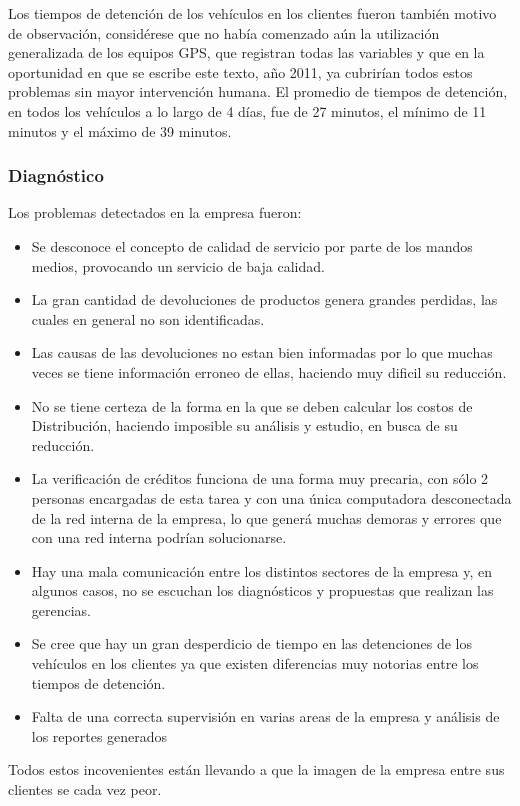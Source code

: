 \documentclass[a4paper,10pt]{article}
\begin{document}
	Los tiempos de detención de los vehículos en los clientes fueron también motivo de observación, considérese que no había comenzado aún la utilización generalizada de los equipos GPS, que registran todas las variables y que en la oportunidad en que se escribe este texto, año 2011, ya cubrirían todos estos problemas sin mayor intervención humana. El promedio de tiempos de detención, en todos los vehículos a lo largo de 4 días, fue de 27 minutos, el mínimo de 11 minutos y el máximo de 39 minutos.
	
	\subsubsection{Diagnóstico}
	Los problemas detectados en la empresa fueron:
	\begin{itemize}
	\item Se desconoce el concepto de calidad de servicio por parte de los mandos medios, provocando un servicio de baja calidad.
	\item La gran cantidad de devoluciones de productos genera grandes perdidas, las cuales en general no son identificadas.
	\item Las causas de las devoluciones no estan bien informadas por lo que muchas veces se tiene información erroneo de ellas, haciendo muy dificil su reducción.
	\item No se tiene certeza de la forma en la que se deben calcular los costos de Distribución, haciendo imposible su análisis y estudio, en busca de su reducción. 
	\item La verificación de créditos funciona de una forma muy precaria, con sólo 2 personas encargadas de esta tarea y con una única computadora desconectada de la red interna de la empresa, lo que generá muchas demoras y errores que con una red interna podrían solucionarse.
	\item Hay una mala comunicación entre los distintos sectores de la empresa y, en algunos casos, no se escuchan los diagnósticos y propuestas que realizan las gerencias.
	\item Se cree que hay un gran desperdicio de tiempo en las detenciones de los vehículos en los clientes ya que existen diferencias muy notorias entre los tiempos de detención.
	\item Falta de una correcta supervisión en varias areas de la empresa y análisis de los reportes generados 
	\end{itemize}
	Todos estos incovenientes están llevando a que la imagen de la empresa entre sus clientes se cada vez peor.	
	
\end{document}

